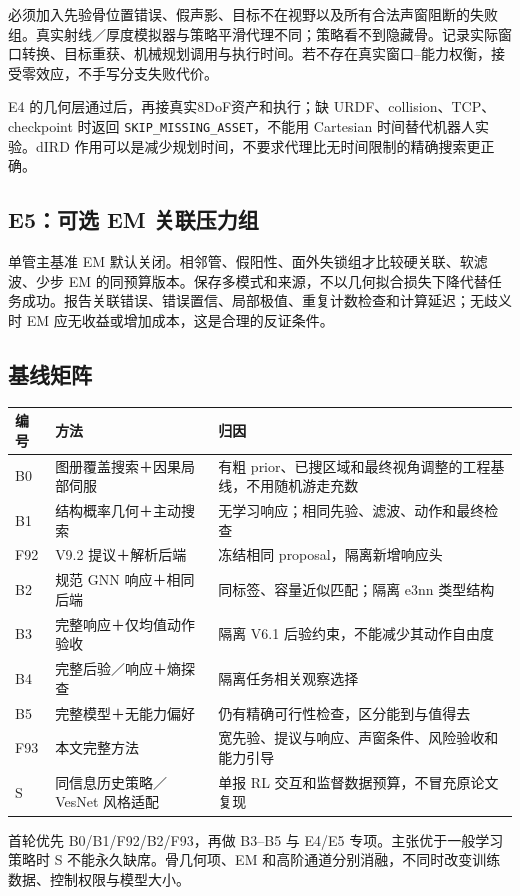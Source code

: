 \documentclass[UTF8,fontset=fandol,11pt,a4paper]{ctexart}
\theoremstyle{plain}
\theoremstyle{definition}
\theoremstyle{remark}
\numberwithin{equation}{section}
\newcommand{\code}[1]{\begingroup\small\nolinkurl{#1}\endgroup}
\begin{document}
必须加入先验骨位置错误、假声影、目标不在视野以及所有合法声窗阻断的失败组。真实射线／厚度模拟器与策略平滑代理不同；策略看不到隐藏骨。记录实际窗口转换、目标重获、机械规划调用与执行时间。若不存在真实窗口--能力权衡，接受零效应，不手写分支失败代价。

E4 的几何层通过后，再接真实8DoF资产和执行；缺 URDF、collision、TCP、checkpoint 时返回 \code{SKIP_MISSING_ASSET}，不能用 Cartesian 时间替代机器人实验。dIRD 作用可以是减少规划时间，不要求代理比无时间限制的精确搜索更正确。

\subsection{E5：可选 EM 关联压力组}
单管主基准 EM 默认关闭。相邻管、假阳性、面外失锁组才比较硬关联、软滤波、少步 EM 的同预算版本。保存多模式和来源，不以几何拟合损失下降代替任务成功。报告关联错误、错误置信、局部极值、重复计数检查和计算延迟；无歧义时 EM 应无收益或增加成本，这是合理的反证条件。

\subsection{基线矩阵}
\begin{longtable}{P{15mm}P{55mm}P{76mm}}
\toprule 编号 & 方法 & 归因\\\midrule\endhead
B0 & 图册覆盖搜索＋因果局部伺服 & 有粗 prior、已搜区域和最终视角调整的工程基线，不用随机游走充数\\
B1 & 结构概率几何＋主动搜索 & 无学习响应；相同先验、滤波、动作和最终检查\\
F92 & V9.2 提议＋解析后端 & 冻结相同 proposal，隔离新增响应头\\
B2 & 规范 GNN 响应＋相同后端 & 同标签、容量近似匹配；隔离 e3nn 类型结构\\
B3 & 完整响应＋仅均值动作验收 & 隔离 V6.1 后验约束，不能减少其动作自由度\\
B4 & 完整后验／响应＋熵探查 & 隔离任务相关观察选择\\
B5 & 完整模型＋无能力偏好 & 仍有精确可行性检查，区分能到与值得去\\
F93 & 本文完整方法 & 宽先验、提议与响应、声窗条件、风险验收和能力引导\\
S & 同信息历史策略／VesNet 风格适配 & 单报 RL 交互和监督数据预算，不冒充原论文复现\\\bottomrule
\end{longtable}

首轮优先 B0/B1/F92/B2/F93，再做 B3--B5 与 E4/E5 专项。主张优于一般学习策略时 S 不能永久缺席。骨几何项、EM 和高阶通道分别消融，不同时改变训练数据、控制权限与模型大小。
\end{document}
